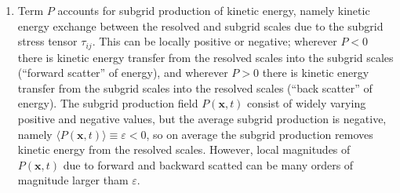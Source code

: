 \begin{enumerate}
    \item Term $P$ accounts for subgrid production of kinetic energy,
        namely kinetic energy exchange between the resolved and subgrid
        scales due to the subgrid stress tensor $\tau_{ij}$. This can be
        locally positive or negative; wherever $P<0$ there is kinetic
        energy transfer from the resolved scales into the subgrid scales
        (``forward scatter'' of energy), and wherever $P>0$ there is
        kinetic energy transfer from the subgrid scales into the resolved
        scales (``back scatter'' of energy). The subgrid production field
        $P(\mathbf{x}, t)$ consist of widely varying positive and negative
        values, but the average subgrid production is negative, namely
        $\langle P(\mathbf{x}, t) \rangle \equiv \varepsilon < 0$, so on
        average the subgrid production removes kinetic energy from the
        resolved scales. However, local magnitudes of $P(\mathbf{x}, t)$
        due to forward and backward scatted can be many orders of magnitude
        larger tham $\varepsilon$.
        
\end{enumerate}





